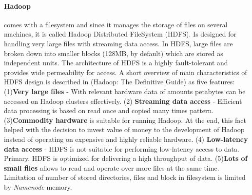 \documentclass[a4paper,12pt,oneside]{report}
\begin{document}
		\paragraph*{Hadoop} comes with a filesystem and since it manages the storage of files on several 
machines, it is called Hadoop Distributed FileSystem (HDFS). Is designed for handling very large files with streaming
data access.\cite{hadoop_hdfs_web} In HDFS, large files are broken down into smaller blocks (128MB, by default) which are 
stored as independent units. The architecture of HDFS is a highly fault-tolerant and provides wide permeability
for access.   
  A short overview of main characteristics of HDFS design is described in (Hadoop: The Definitive 
  Guide\cite{hadoop_definitive}) as five features: (1)\textbf{Very large files} - With relevant hardware data of amounts petabytes 
can be accessed on Hadoop clusters effectively. (2) \textbf{Streaming data access} - Efficient data processing is based on
 read once and copied many times pattern. (3)\textbf{Commodity hardware} is suitable for running Hadoop. At the end,
 this fact helped with the decision to invest value of money to the development of Hadoop instead 
 of operating on expensive and highly reliable hardware. (4) \textbf{Low-latency data access} - HDFS is not suitable for performing
 low-latency access to data. Primary, HDFS is optimized for delivering
a high throughput of data. (5)\textbf{Lots of small files} allows to read and operate over more files
 at the same time. Limitation of number of stored directories,  files and block in filesystem is limited by \emph{Namenode} memory.
\end{document}
